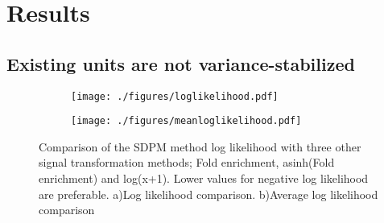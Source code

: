 \documentclass[11pt]{article}
\begin{document}




\section{Results}

\subsection{Existing units are not variance-stabilized}
\begin{figure}[th!]
	\begin{subfigure}[b]{1\textwidth}
		\texttt{[image: ./figures/loglikelihood.pdf]}
		\caption{}
		\label{fig:firstlog}
		\hfill
	\end{subfigure}
	\begin{subfigure}[b]{0.6\textwidth}
		\texttt{[image: ./figures/meanloglikelihood.pdf]}
		\caption{}
		\label{fig:bandpearson}
	\end{subfigure}
	
	\caption{Comparison of the SDPM method log likelihood with three other signal transformation methods; Fold enrichment, asinh(Fold enrichment) and log(x+1). 
	Lower values for negative log likelihood are preferable. a)Log likelihood comparison. b)Average log likelihood comparison
	}
	\label{fig:log}
\end{figure}
\end{document}
